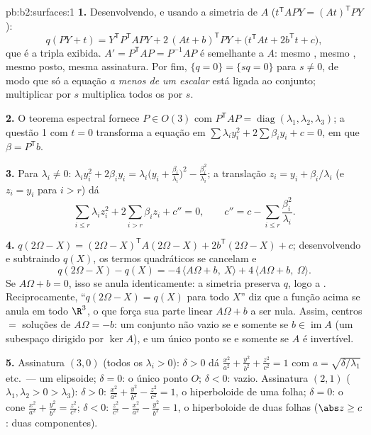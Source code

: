 \begin{solution}{pb:b2:surfaces:1}
\textbf{1.} Desenvolvendo, e usando a simetria de $A$
($t^{\mathsf T}\!APY = (At)^{\mathsf T}PY$):
\[
q(PY + t) = Y^{\mathsf T}P^{\mathsf T}\!APY +
2\,(At + b)^{\mathsf T}PY + \bigl(t^{\mathsf T}\!At +
2b^{\mathsf T}t + c\bigr),
\]
que é a tripla exibida. $A' = P^{\mathsf T}\!AP =
P^{-1}AP$ é semelhante a $A$: mesmo ,
mesmo , mesmo posto, mesma assinatura. Por fim, $\{q = 0\} = \{sq = 0\}$
para $s \neq 0$, de modo que só a equação \emph{a menos de um escalar} está
ligada ao conjunto; multiplicar por $s$ multiplica todos os 
por $s$.

\textbf{2.} O teorema espectral fornece $P \in O(3)$ com
$P^{\mathsf T}\!AP = \operatorname{diag}(\lambda_1, \lambda_2,
\lambda_3)$; a questão 1 com $t = 0$ transforma a equação em
$\sum\lambda_iy_i^2 + 2\sum\beta_iy_i + c = 0$, em que $\beta =
P^{\mathsf T}b$.

\textbf{3.} Para $\lambda_i \neq 0$: $\lambda_iy_i^2 +
2\beta_iy_i = \lambda_i\bigl(y_i +
\frac{\beta_i}{\lambda_i}\bigr)^2 -
\frac{\beta_i^2}{\lambda_i}$; a translação $z_i = y_i +
\beta_i/\lambda_i$ (e $z_i = y_i$ para $i > r$) dá
\[
\sum_{i \leq r}\lambda_iz_i^2 + 2\sum_{i > r}\beta_iz_i +
c'' = 0, \qquad
c'' = c - \sum_{i\leq r}\frac{\beta_i^2}{\lambda_i}.
\]

\textbf{4.} $q(2\Omega - X) = (2\Omega - X)^{\mathsf T}
A(2\Omega - X) + 2b^{\mathsf T}(2\Omega - X) + c$; desenvolvendo
e subtraindo $q(X)$, os termos quadráticos se cancelam e
\[
q(2\Omega - X) - q(X) = -4\,\langle A\Omega + b,\ X\rangle +
4\,\langle A\Omega + b,\ \Omega\rangle .
\]
Se $A\Omega + b = 0$, isso se anula identicamente: a simetria
 preserva $q$, logo a . Reciprocamente,
``$q(2\Omega - X) = q(X)$ para todo $X$'' diz que a função 
acima se anula em todo $\R^3$, o que força sua
parte linear $A\Omega + b$ a ser nula. Assim, centros $=$ soluções de
$A\Omega = -b$: um conjunto não vazio se e somente se $b \in \operatorname{im}A$
(um subespaço  dirigido por $\ker A$), e um único ponto
se e somente se $A$ é invertível.

\textbf{5.} Assinatura $(3,0)$ (todos os $\lambda_i > 0$): $\delta >
0$ dá $\frac{x^2}{a^2} + \frac{y^2}{b^2} + \frac{z^2}{c^2}
= 1$ com $a = \sqrt{\delta/\lambda_1}$ etc.\ --- um
elipsoide; $\delta = 0$: o único ponto $O$; $\delta < 0$:
vazio. Assinatura $(2,1)$ ($\lambda_1, \lambda_2 > 0 >
\lambda_3$): $\delta > 0$: $\frac{x^2}{a^2} + \frac{y^2}{b^2}
- \frac{z^2}{c^2} = 1$, o hiperboloide de uma folha; $\delta =
0$: o cone $\frac{x^2}{a^2} + \frac{y^2}{b^2} =
\frac{z^2}{c^2}$; $\delta < 0$: $\frac{z^2}{c^2} -
\frac{x^2}{a^2} - \frac{y^2}{b^2} = 1$, o hiperboloide de
duas folhas ($\abs z \geq c$: duas componentes).


\end{solution}

